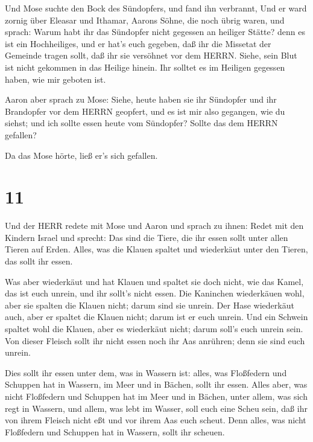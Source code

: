  Und Mose suchte den Bock des Sündopfers, und fand ihn
verbrannt, Und er ward zornig über Eleasar und Ithamar, Aarons Söhne,
die noch übrig waren, und sprach:  Warum habt ihr das
Sündopfer nicht gegessen an heiliger Stätte? denn es ist ein
Hochheiliges, und er hat's euch gegeben, daß ihr die Missetat der
Gemeinde tragen sollt, daß ihr sie versöhnet vor dem HERRN.
 Siehe, sein Blut ist nicht gekommen in das Heilige hinein.
Ihr solltet es im Heiligen gegessen haben, wie mir geboten ist.

 Aaron aber sprach zu Mose: Siehe, heute haben sie ihr
Sündopfer und ihr Brandopfer vor dem HERRN geopfert, und es ist mir also
gegangen, wie du siehst; und ich sollte essen heute vom Sündopfer?
Sollte das dem HERRN gefallen?

 Da das Mose hörte, ließ er's sich gefallen.

\hypertarget{section-10}{%
\section{11}\label{section-10}}

 Und der HERR redete mit Mose und Aaron und sprach zu ihnen:
 Redet mit den Kindern Israel und sprecht: Das sind die
Tiere, die ihr essen sollt unter allen Tieren auf Erden. 
Alles, was die Klauen spaltet und wiederkäut unter den Tieren, das sollt
ihr essen.

 Was aber wiederkäut und hat Klauen und spaltet sie doch
nicht, wie das Kamel, das ist euch unrein, und ihr sollt's nicht essen.
 Die Kaninchen wiederkäuen wohl, aber sie spalten die Klauen
nicht; darum sind sie unrein.  Der Hase wiederkäut auch,
aber er spaltet die Klauen nicht; darum ist er euch unrein. 
Und ein Schwein spaltet wohl die Klauen, aber es wiederkäut nicht; darum
soll's euch unrein sein.  Von dieser Fleisch sollt ihr nicht
essen noch ihr Aas anrühren; denn sie sind euch unrein.

 Dies sollt ihr essen unter dem, was in Wassern ist: alles,
was Floßfedern und Schuppen hat in Wassern, im Meer und in Bächen, sollt
ihr essen.  Alles aber, was nicht Floßfedern und Schuppen
hat im Meer und in Bächen, unter allem, was sich regt in Wassern, und
allem, was lebt im Wasser, soll euch eine Scheu sein,  daß
ihr von ihrem Fleisch nicht eßt und vor ihrem Aas euch scheut.
 Denn alles, was nicht Floßfedern und Schuppen hat in
Wassern, sollt ihr scheuen.

